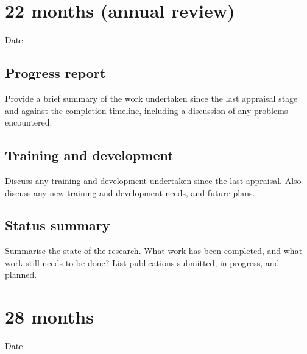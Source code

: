 \documentclass[12pt,a4paper]{article}
\begin{document}
\section{22 months (annual review)}

\begin{description}
	\item[Date] %
\end{description}

\subsection{Progress report}
Provide a brief summary of the work undertaken since the last appraisal stage and against the completion timeline, including a discussion of any problems encountered. %

\subsection{Training and development}
Discuss any training and development undertaken since the last appraisal. Also discuss any new training and development needs, and future plans. %

\subsection{Status summary}
Summarise the state of the research. What work has been completed, and what work still needs to be done? List publications submitted, in progress, and planned. %


\section{28 months}

\begin{description}
	\item[Date] %
\end{description}
\end{document}

